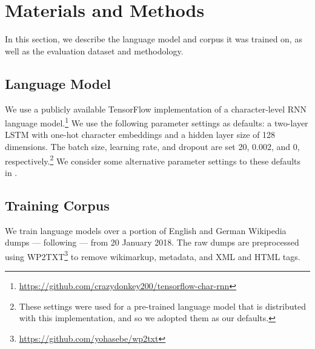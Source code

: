 \documentclass[11pt]{article}
\begin{document}

\section{Materials and Methods}

In this section, we describe the language model and corpus it was
trained on, as well as the evaluation dataset and methodology.

\subsection{Language Model\label{sec:parameters}} 

We use a publicly available TensorFlow implementation of a
character-level RNN language
model.\footnote{\url{https://github.com/crazydonkey200/tensorflow-char-rnn}}
We use the following parameter settings as defaults: a two-layer LSTM
with one-hot character embeddings and a hidden layer size of 128
dimensions. The batch size, learning rate, and dropout are set 20,
0.002, and 0, respectively.\footnote{These settings were used for a
  pre-trained language model that is distributed with this
  implementation, and so we adopted them as our defaults.} We consider
some alternative parameter settings to these defaults in
.


\subsection{Training Corpus}
We train language models over a portion of English and German
Wikipedia dumps --- following \cite{Salehi+:2015} --- from 20 January
2018. The raw dumps are preprocessed using
WP2TXT\footnote{\url{https://github.com/yohasebe/wp2txt}} to remove
wikimarkup, metadata, and XML and HTML tags.
\end{document}
